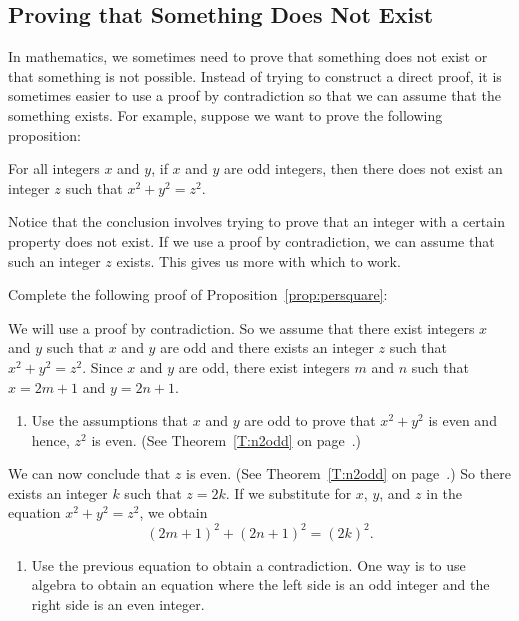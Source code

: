\subsection*{Proving that Something Does Not Exist}
In mathematics, we sometimes need to prove that something does not exist or that something is not possible.  Instead of trying to construct a direct proof, it is sometimes easier to use a proof by contradiction so that we can assume that the something exists.
For example, suppose we want to prove the following proposition:

\begin{proposition} \label{prop:persquare}
For all integers $x$ and $y$, if $x$ and $y$ are odd integers, then there does not exist an integer $z$ such that $x^2 + y^2 = z^2$.
\end{proposition}
Notice that the conclusion involves trying to prove that an integer with a certain property does not exist.  If we use a proof by contradiction, we can assume that such an integer $z$ exists.  This gives us more with which to work.
\begin{prog} \label{prog:persquare}
Complete the following proof of Proposition~\ref{prop:persquare}:
\begin{myproof}
We will use a proof by contradiction.  So we assume that there exist integers $x$ and $y$ such that $x$ and $y$ are odd and there exists an integer $z$ such that $x^2 + y^2 = z^2$.  Since $x$ and $y$ are odd, there exist integers $m$ and $n$ such that $x = 2m + 1$ and $y = 2n + 1$.
\begin{enumerate}
  \item Use the assumptions that $x$ and $y$ are odd to prove that $x^2 + y^2$ is even and hence, $z^2$ is even.  (See Theorem~\ref{T:n2odd} on page~\pageref{T:n2odd}.)
\end{enumerate}
We can now conclude that $z$ is even.  (See Theorem~\ref{T:n2odd} on page~\pageref{T:n2odd}.)  So there exists an integer $k$ such that $z = 2k$.  If we substitute for $x$, $y$, and $z$ in the equation $x^2 + y^2 = z^2$, we obtain
\[
(2m + 1)^2 + (2n + 1)^2 = (2k)^2.
\]
\setcounter{oldenumi}{\theenumi}
\begin{enumerate} \setcounter{enumi}{\theoldenumi}
  \item Use the previous equation to obtain a contradiction.  \hint One way is to use algebra to obtain an equation where the left side is an odd integer and the right side is an even integer. \qedhere
\end{enumerate}
\end{myproof}

\end{prog}
\hbreak

\endinput


